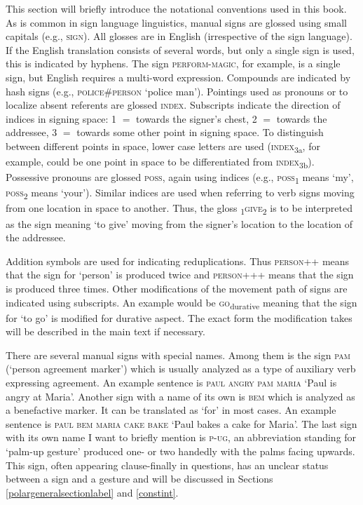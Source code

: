 \label{notational}
\begin{refsection}
This section will briefly introduce the notational conventions used in this book. As is common in sign language linguistics, manual signs are glossed using small capitals (e.g., \textsc{sign}). All glosses are in English (irrespective of the sign language). If the English translation consists of several words, but only a single sign is used, this is indicated by hyphens. The sign \textsc{perform-magic}, for example, is a single sign, but English requires a multi-word expression. Compounds are indicated by hash signs (e.g., \textsc{police\#person} `police man'). Pointings used as pronouns or to localize absent referents are glossed \textsc{index}. Subscripts indicate the direction of indices in signing space: 1 $=$ towards the signer's chest, 2 $=$ towards the addressee, 3 $=$ towards some other point in signing space. To distinguish between different points in space, lower case letters are used (\textsc{index}\textsubscript{3a}, for example, could be one point in space to be differentiated from \textsc{index}\textsubscript{3b}). Possessive pronouns are glossed \textsc{poss}, again using indices (e.g., \textsc{poss}\textsubscript{1} means `my', \textsc{poss}\textsubscript{2} means `your'). Similar indices are used when referring to verb signs moving from one location in space to another. Thus, the gloss \textsubscript{1}\textsc{give}\textsubscript{2} is to be interpreted as the sign meaning `to give' moving from the signer’s location to the location of the addressee. 

Addition symbols are used for indicating reduplications. Thus \textsc{person}++ means that the sign for `person' is produced twice and \textsc{person}+++ means that the sign is produced three times. Other modifications of the movement path of signs are indicated using subscripts. An example would be \textsc{go}\textsubscript{durative} meaning that the sign for `to go' is modified for durative aspect. The exact form the modification takes will be described in the main text if necessary.

There are several manual signs with special names. Among them is the sign \textsc{pam} (`person agreement marker') which is usually analyzed as a type of auxiliary verb expressing agreement. An example sentence is \textsc{paul angry pam maria} `Paul is angry at Maria'. Another sign with a name of its own is \textsc{bem} which is analyzed as a benefactive marker. It can be translated as `for' in most cases. An example sentence is \textsc{paul bem maria cake bake} `Paul bakes a cake for Maria'. The last sign with its own name I want to briefly mention is \textsc{p-ug}, an abbreviation standing for `palm-up gesture' produced one- or two handedly with the palms facing upwards. This sign, often appearing clause-finally in questions, has an unclear status between a sign and a gesture and will be discussed in Sections \ref{polargeneralsectionlabel} and \ref{constint}. 


\end{refsection}
